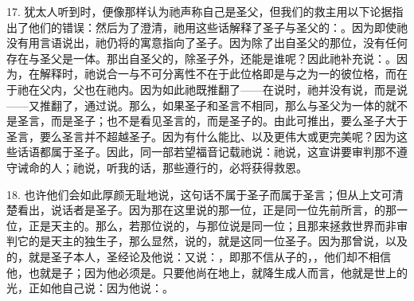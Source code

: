 17. 犹太人听到时，便像那样认为祂声称自己是圣父，但我们的救主用以下论据指出了他们的错误：然后为了澄清，祂用这些话解释了圣子与圣父的：。因为即使祂没有用言语说出，祂仍将的寓意指向了圣子。因为除了出自圣父的那位，没有任何存在与圣父是一体。那出自圣父的，除圣子外，还能是谁呢？因此祂补充说：。因为，在解释时，祂说合一与不可分离性不在于此位格即是与之为一的彼位格，而在于祂在父内，父也在祂内。因为如此祂既推翻了——在说时，祂并没有说，而是说——又推翻了，通过说。那么，如果圣子和圣言不相同，那么与圣父为一体的就不是圣言，而是圣子；也不是看见圣言的，而是圣子的。由此可推出，要么圣子大于圣言，要么圣言并不超越圣子。因为有什么能比、以及更伟大或更完美呢？因为这些话语都属于圣子。因此，同一部若望福音记载祂说：祂说，这宣讲要审判那不遵守诫命的人；祂说，听我的话，那些遵行的，必将获得救恩。\par

18. 也许他们会如此厚颜无耻地说，这句话不属于圣子而属于圣言；但从上文可清楚看出，说话者是圣子。因为那在这里说的那一位，正是同一位先前所言，的那一位，正是天主的。那么，若那位说的，与那位说是同一位；且那来拯救世界而非审判它的是天主的独生子，那么显然，说的，就是这同一位圣子。因为那曾说，以及的，就是圣子本人，圣经论及他说：又说：，即那不信从子的，，他们却不相信他，也就是子；因为他必须是。只要他尚在地上，就降生成人而言，他就是世上的光，正如他自己说：因为他说：。\par

